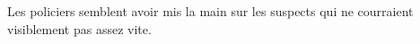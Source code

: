     \setlength{\columnseprule}{0.4pt}
    \begin{multicols}{2}\raggedcolumns
        Les policiers semblent avoir mis 
        la main sur les suspects qui ne 
        courraient visiblement pas 
        assez vite.
    \end{multicols}
